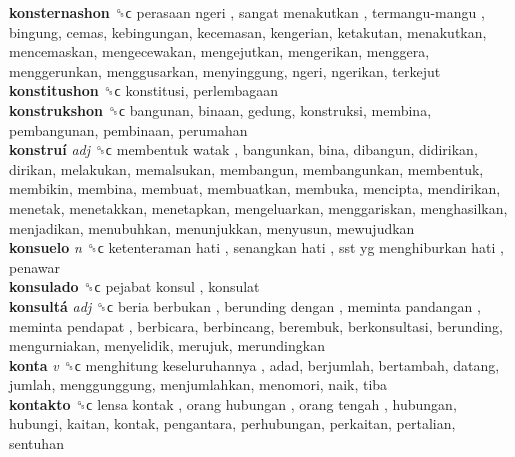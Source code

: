 \textbf{konsternashon} ␝ϲ   perasaan ngeri ,  sangat menakutkan ,  termangu-mangu , bingung, cemas, kebingungan, kecemasan, kengerian, ketakutan, menakutkan, mencemaskan, mengecewakan, mengejutkan, mengerikan, menggera, menggerunkan, menggusarkan, menyinggung, ngeri, ngerikan, terkejut  \\
\textbf{konstitushon} ␝ϲ  konstitusi, perlembagaan  \\
\textbf{konstrukshon} ␝ϲ  bangunan, binaan, gedung, konstruksi, membina, pembangunan, pembinaan, perumahan  \\
\textbf{konstruí} \emph{adj}  ␝ϲ   membentuk watak , bangunkan, bina, dibangun, didirikan, dirikan, melakukan, memalsukan, membangun, membangunkan, membentuk, membikin, membina, membuat, membuatkan, membuka, mencipta, mendirikan, menetak, menetakkan, menetapkan, mengeluarkan, menggariskan, menghasilkan, menjadikan, menubuhkan, menunjukkan, menyusun, mewujudkan  \\
\textbf{konsuelo} \emph{n}  ␝ϲ   ketenteraman hati ,  senangkan hati ,  sst yg menghiburkan hati , penawar  \\
\textbf{konsulado} ␝ϲ   pejabat konsul , konsulat  \\
\textbf{konsultá} \emph{adj}  ␝ϲ   beria berbukan ,  berunding dengan ,  meminta pandangan ,  meminta pendapat , berbicara, berbincang, berembuk, berkonsultasi, berunding, mengurniakan, menyelidik, merujuk, merundingkan  \\
\textbf{konta} \emph{v}  ␝ϲ   menghitung keseluruhannya , adad, berjumlah, bertambah, datang, jumlah, menggunggung, menjumlahkan, menomori, naik, tiba  \\
\textbf{kontakto} ␝ϲ   lensa kontak ,  orang hubungan ,  orang tengah , hubungan, hubungi, kaitan, kontak, pengantara, perhubungan, perkaitan, pertalian, sentuhan  \\
